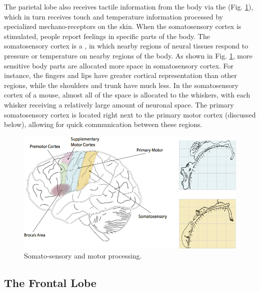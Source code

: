 The parietal lobe also receives tactile information from the body via the  (Fig. \ref{brain_motor}), which in turn receives touch and temperature information processed by specialized mechano-receptors on the skin. When the somatosensory cortex is stimulated, people report feelings in specific parts of the body. The somatosensory cortex is a , in which nearby regions of neural tissues respond to pressure or temperature on nearby regions of the body. As shown in Fig. \ref{brain_motor}, more sensitive body parts are allocated more space in somatosensory cortex. For instance, the fingers and lips have greater cortical representation than other regions, while the shoulders and trunk have much less. In the somatosensory cortex of a mouse, almost all of the space is allocated to the whiskers, with each whisker receiving a relatively large amount of neuronal space. The primary somatosensory cortex is located right next to the primary motor cortex (discussed below), allowing for quick communication between these regions. 

\begin{figure}[h]
\centering
\includegraphics[scale=.8]{./images/brain_motor.png}
\caption[Pamela Payne.]{Somato-sensory and motor processing.}
\label{brain_motor}
\end{figure}

\subsection{The Frontal Lobe}
 
